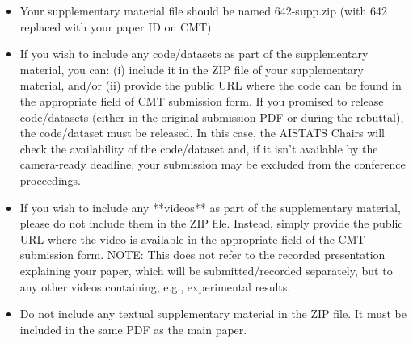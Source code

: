 \documentclass[twoside]{article}
\begin{document}
\begin{itemize}
  \item Your supplementary material file should be named 642-supp.zip (with 642
        replaced with your paper ID on CMT).
  \item If you wish to include any code/datasets as part of the supplementary
        material, you can: (i) include it in the ZIP file of your supplementary
        material, and/or (ii) provide the public URL where the code can be found in
        the appropriate field of CMT submission form.  If you promised to release
        code/datasets (either in the original submission PDF or during the rebuttal),
        the code/dataset must be released. In this case, the AISTATS Chairs will
        check the availability of the code/dataset and, if it isn’t available by the
        camera-ready deadline, your submission may be excluded from the conference
        proceedings.
  \item If you wish to include any **videos** as part of the supplementary material,
        please do not include them in the ZIP file. Instead, simply provide the
        public URL where the video is available in the appropriate field of the CMT
        submission form. NOTE: This does not refer to the recorded presentation
        explaining your paper, which will be submitted/recorded separately, but to any other videos containing, e.g., experimental results.
  \item Do not include any textual supplementary material in the ZIP file. It must be
        included in the same PDF as the main paper.
\end{itemize}


\vfill
\end{document}
